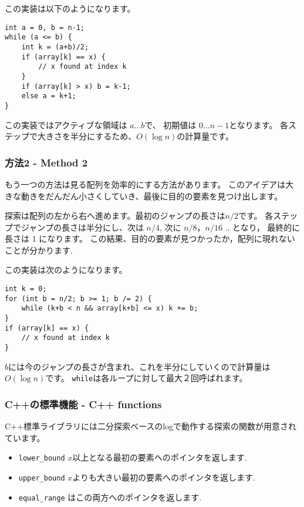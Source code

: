 この実装は以下のようになります。
\begin{lstlisting}
int a = 0, b = n-1;
while (a <= b) {
    int k = (a+b)/2;
    if (array[k] == x) {
        // x found at index k
    }
    if (array[k] > x) b = k-1;
    else a = k+1;
}
\end{lstlisting}

この実装ではアクティブな領域は $a \ldots b$で、
初期値は $0 \ldots n-1$となります。
各ステップで大きさを半分にするため、$O(\log n)$の計算量です。

\subsubsection{方法2 - Method 2}

もう一つの方法は見る配列を効率的にする方法があります。
このアイデアは大きな動きをだんだん小さくしていき、最後に目的の要素を見つけ出します。

探索は配列の左から右へ進めます。最初のジャンプの長さは$n/2$です。
各ステップでジャンプの長さは半分にし、次は $n/4$,
次に $n/8$，$n/16$ .. となり，
最終的に長さは 1 になります。
この結果、目的の要素が見つかったか，配列に現れないことが分かります.

この実装は次のようになります。
\begin{lstlisting}
int k = 0;
for (int b = n/2; b >= 1; b /= 2) {
    while (k+b < n && array[k+b] <= x) k += b;
}
if (array[k] == x) {
    // x found at index k
}
\end{lstlisting}

$b$には今のジャンプの長さが含まれ、これを半分にしていくので計算量は$O(\log n)$です。
\texttt{while}は各ループに対して最大２回呼ばれます。

\subsubsection{C++の標準機能 - C++ functions}

C++標準ライブラリには二分探索ベースのlogで動作する探索の関数が用意されています。

\begin{itemize}
\item \texttt{lower\_bound} $x$以上となる最初の要素へのポインタを返します.
\item \texttt{upper\_bound} $x$よりも大きい最初の要素へのポインタを返します.
\item \texttt{equal\_range} はこの両方へのポインタを返します.
\end{itemize}

